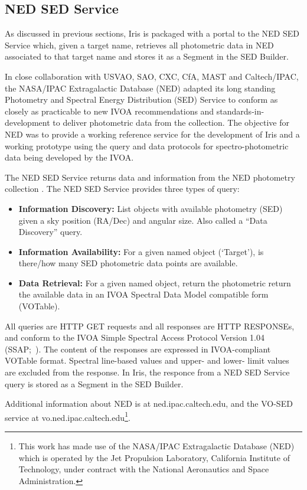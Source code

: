 \documentclass[5p]{elsarticle}
\begin{document}
\subsection{NED SED Service}
\label{subsec:ned}

As discussed in previous sections, Iris is packaged with a portal to the NED SED Service which, given a target name, retrieves all photometric data in NED associated to that target name and stores it as a Segment in the SED Builder.

In close collaboration with USVAO, SAO, CXC, CfA, MAST and Caltech/IPAC, the NASA/IPAC Extragalactic Database (NED) adapted its long standing Photometry and Spectral Energy Distribution (SED) Service to conform as closely as practicable to new IVOA recommendations and
standards-in-development to deliver photometric data from the collection. The objective for NED was to provide a working reference service for the development of Iris and a working prototype using the query and data protocols for spectro-photometric data being developed by the IVOA.

The NED SED Service returns data and information from the NED photometry collection \citep{2007ASPC..376..153M}. The NED SED Service provides three types of query:
\begin{itemize}
 \item \textbf{Information Discovery:} List objects with available photometry (SED) given a sky position (RA/Dec) and angular size.  Also called a ``Data Discovery'' query.
 \item \textbf{Information Availability:} For a given named object (`Target'), is there/how many SED photometric data points are available.
 \item \textbf{Data Retrieval:} For a given named object, return the photometric return the available data in an IVOA Spectral Data Model compatible form (VOTable).
\end{itemize}

All queries are HTTP GET requests and all responses are HTTP RESPONSEs, and conform to the IVOA Simple Spectral Access Protocol Version 1.04 (SSAP;~\citep{2012arXiv1203.5725T}).  The content of the responses are expressed in IVOA-compliant VOTable format. Spectral line-based values and upper- and lower- limit values are excluded from the response. In Iris, the responce from a NED SED Service query is stored as a Segment in the SED Builder.

Additional information about NED is at ned.ipac.caltech.edu, and the VO-SED service at
vo.ned.ipac.caltech.edu\footnote{This work has made use of the NASA/IPAC Extragalactic Database (NED) which is operated by the Jet Propulsion Laboratory, California Institute of Technology, under contract with the National Aeronautics and Space Administration.}. 
\end{document}
